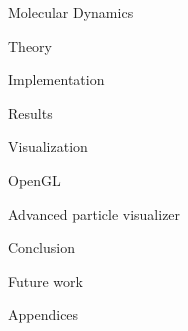 \documentclass[twoside,english, a4paper, 12pt]{uiofysmaster}
\begin{document}
\begin{part}{Molecular Dynamics}
  \begin{chapter}{Theory}
  \label{chap:md}
  
  
  
  
  
  \end{chapter}

  \begin{chapter}{Implementation}
  \label{chap:md_implementation}
    
    
    
    
  \end{chapter}

  \begin{chapter}{Results}
    
    
  \end{chapter}  
\end{part}

\begin{part}{Visualization}
  
  \begin{chapter}{OpenGL}
    \label{chap:opengl}
    
    
    
    
  \end{chapter}
  
  \begin{chapter}{Advanced particle visualizer}
    \label{chap:particle_visualizer}
    
    
    
    
  \end{chapter}
\end{part}

\begin{part}{Conclusion}
\begin{chapter}{Future work}

\end{chapter}
\end{part}
\begin{part}{Appendices}
\begin{appendices}



\end{appendices}
\end{part}
\printbibliography
\end{document}
